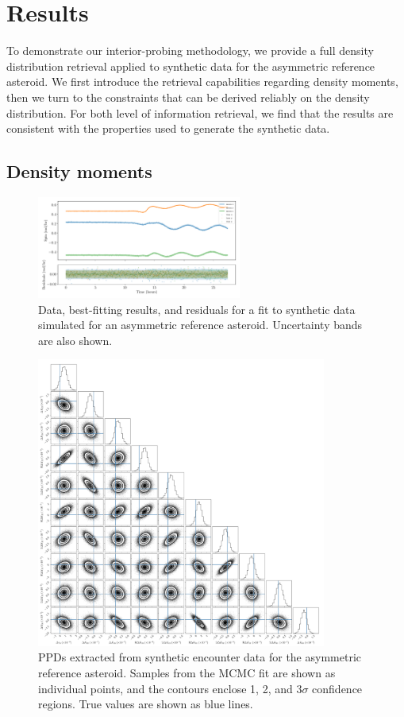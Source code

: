 \documentclass[fleqn,usenatbib]{mnras}
\begin{document}
\section{Results}
\label{sec:results}

To demonstrate our interior-probing methodology, we provide a full density distribution retrieval applied to synthetic data for the asymmetric reference asteroid. We first introduce the retrieval capabilities regarding density moments, then we turn to the constraints that can be derived reliably on the density distribution. For both level of information retrieval, we find that the results are consistent with the properties used to generate the synthetic data.

\subsection{Density moments}
\label{sec:example-fit}
\begin{figure}
  \centering
  \includegraphics[width=0.6\textwidth]{figs/example-residuals.pdf}
  \caption{Data, best-fitting results, and residuals for a fit to synthetic data simulated for an asymmetric reference asteroid. Uncertainty bands are also shown.}
  \label{fig:example-residuals}
\end{figure}

\begin{figure}
  \centering
  \includegraphics[width=0.85\textwidth]{figs/example-corner.png}
  \caption{PPDs extracted from synthetic encounter data for the asymmetric reference asteroid. Samples from the MCMC fit are shown as individual points, and the contours enclose 1, 2, and 3$\sigma$ confidence regions. True values are shown as blue lines.}
  \label{fig:example-corner}
\end{figure}
\end{document}
